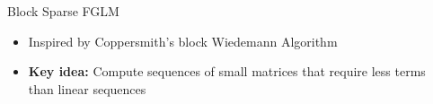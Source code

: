 \documentclass[final]{beamer}
\newlength{\sepwid}
\newlength{\twocolwid}
\begin{document}
\begin{frame}[t]
\begin{columns}[t]
\begin{column}{\sepwid}\end{column} %

\begin{column}{\twocolwid} %

\begin{block}{Block Sparse FGLM}
	\begin{itemize}
		\item Inspired by Coppersmith's block Wiedemann Algorithm \cite{Coppersmith93}
		\item \textbf{Key idea:} Compute sequences of small matrices that require less terms
		than linear sequences
	\end{itemize}
	

\end{block}
\end{column}
\end{columns}
\end{frame}
\end{document}
